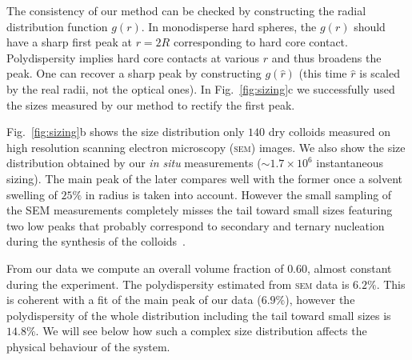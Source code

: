 \documentclass[8.5pt,twoside,twocolumn]{article}
\begin{document}
The consistency of our method can be checked by constructing the radial distribution function $g(r)$. In monodisperse hard spheres, the $g(r)$ should have a sharp first peak at $r=2R$ corresponding to hard core contact. Polydispersity implies hard core contacts at various $r$ and thus broadens the peak. One can recover a sharp peak by constructing $g(\hat{r})$ (this time $\hat{r}$ is scaled by the real radii, not the optical ones). In Fig.~\ref{fig:sizing}c we successfully used the sizes measured by our method to rectify the first peak.

Fig.~\ref{fig:sizing}b shows the size distribution only $140$ dry colloids measured on high resolution scanning electron microscopy (\textsc{sem}) images. We also show the size distribution obtained by our \emph{in situ} measurements ($\sim 1.7\times 10^6$ instantaneous sizing). The main peak of the later compares well with the former once a solvent swelling of $25\%$ in radius is taken into account. However the small sampling of the SEM measurements completely misses the tail toward small sizes featuring two low peaks that probably correspond to secondary and ternary nucleation during the synthesis of the colloids~\cite{bosma2002,Poon2012}.

From our data we compute an overall volume fraction of $0.60$, almost constant during the experiment. The polydispersity estimated from \textsc{sem} data is $6.2\%$. This is coherent with a fit of the main peak of our data ($6.9\%$), however the polydispersity of the whole distribution including the tail toward small sizes is $14.8\%$. We will see below how such a complex size distribution affects the physical behaviour of the system.
\end{document}
